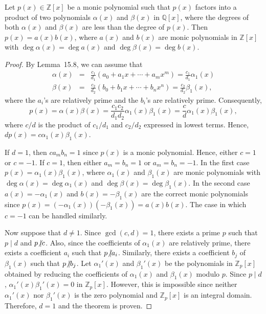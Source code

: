  
\begin{theorem}
Let $p(x) \in {\mathbb Z}[x]$ be a monic polynomial such that $p(x)$
factors into a product of two polynomials $\alpha(x)$ and $\beta(x)$
in ${\mathbb Q}[x]$, where the degrees of both $\alpha(x)$ and $\beta(x)$
are less than the degree of $p(x)$. Then $p(x) = a(x) b(x)$, where
$a(x)$ and $b(x)$ are monic polynomials in ${\mathbb Z}[x]$ with $\deg
\alpha(x) = \deg a(x)$ and $\deg \beta(x) = \deg b(x)$. 
\end{theorem}
 
 
\begin{proof}
By Lemma~15.8, we can assume that
\begin{eqnarray*}
\alpha(x)  & = &  \frac{c_1}{d_1} (a_0 + a_1 x + \cdots + a_m x^m )=
\frac{c_1}{d_1} \alpha_1(x) \\
\beta(x)  & = &  \frac{c_2}{d_2} (b_0 + b_1 x + \cdots + b_n x^n)  =
\frac{c_2}{d_2} \beta_1(x),
\end{eqnarray*}
where the $a_i$'s are relatively prime and the $b_i$'s are relatively
prime. Consequently, 
$$
p(x) = \alpha(x) \beta(x) = \frac{c_1 c_2}{d_1 d_2} \alpha_1(x)
\beta_1(x) = \frac{c}{d} \alpha_1(x) \beta_1(x),
$$
where  $c/d$ is the product of $c_1/d_1$ and $c_2/d_2$ expressed in
lowest terms. Hence, $d p(x) = c \alpha_1(x) \beta_1(x)$. 

 
 
If $d = 1$, then $c a_m b_n = 1$ since $p(x)$ is a monic polynomial.
Hence, either $c=1$ or $c = -1$. If $c=1$, then either $a_m = b_n = 1$ or
$a_m = b_n = -1$. In the first case $p(x) = \alpha_1(x) \beta_1(x)$,
where $\alpha_1(x)$ and $\beta_1(x)$ are monic polynomials with $\deg
\alpha(x) = \deg \alpha_1(x)$ and $\deg \beta(x) = \deg \beta_1(x)$.
In the second case $a(x) = -\alpha_1(x)$ and $b(x) = -\beta_1(x)$ are
the correct monic polynomials since $p(x) = (-\alpha_1(x))(-
\beta_1(x)) = a(x) b(x)$. The case in which $c = -1$ can be handled
similarly. 
 
 
Now suppose that $d \neq 1$. Since $\gcd(c, d) = 1$, there exists a
prime $p$ such that $p \mid d$ and $p {\not{\mid}} c$. Also, since the
coefficients of $\alpha_1(x)$ are relatively prime, there exists a
coefficient $a_i$ such that $p {\not{\mid}} a_i$.  Similarly, there exists
a coefficient $b_j$ of $\beta_1(x)$ such that $p {\not{\mid}} b_j$. Let 
$\alpha_1'(x)$ and $\beta_1'(x)$ be the polynomials in ${\mathbb Z}_p[x]$
obtained by reducing the coefficients of $\alpha_1(x)$ and
$\beta_1(x)$ modulo $p$. Since $p \mid d$, $\alpha_1'(x) \beta_1'(x) = 
0$ in ${\mathbb Z}_p[x]$. However, this is impossible since neither
$\alpha_1'(x)$ nor $\beta_1'(x)$ is the zero polynomial and ${\mathbb
Z}_p[x]$ is an integral domain.  Therefore, $d=1$ and the theorem is
proven. 
\end{proof}
 
